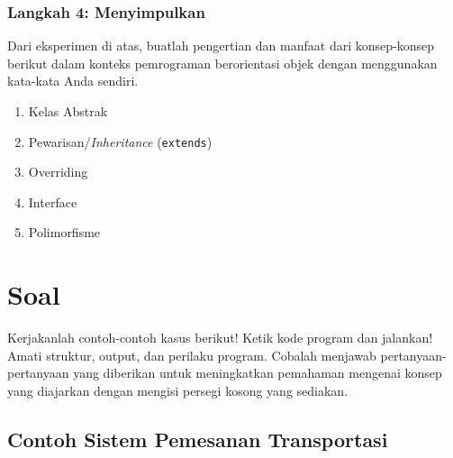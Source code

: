 \subsubsection{Langkah 4: Menyimpulkan}
Dari eksperimen di atas, buatlah pengertian dan manfaat dari konsep-konsep berikut dalam konteks pemrograman berorientasi objek dengan menggunakan kata-kata Anda sendiri.
\begin{enumerate}
	\item Kelas Abstrak
	\begin{tcolorbox}[colback=white, colframe=black,  width=\linewidth, height=3cm,  boxrule=1pt, sharp corners]
	\end{tcolorbox}
	\item Pewarisan/\textit{Inheritance} (\texttt{extends})
	\begin{tcolorbox}[colback=white, colframe=black,  width=\linewidth, height=3cm,  boxrule=1pt, sharp corners]
	\end{tcolorbox}
	\item Overriding
	\begin{tcolorbox}[colback=white, colframe=black,  width=\linewidth, height=3cm,  boxrule=1pt, sharp corners]
	\end{tcolorbox}
	\item Interface
	\begin{tcolorbox}[colback=white, colframe=black,  width=\linewidth, height=3cm,  boxrule=1pt, sharp corners]
	\end{tcolorbox}
	\item Polimorfisme
	\begin{tcolorbox}[colback=white, colframe=black,  width=\linewidth, height=3cm,  boxrule=1pt, sharp corners]
	\end{tcolorbox}
\end{enumerate}


\section{Soal}

Kerjakanlah contoh-contoh kasus berikut! Ketik kode program dan jalankan! Amati struktur, output, dan perilaku program. Cobalah menjawab pertanyaan-pertanyaan yang diberikan untuk meningkatkan pemahaman mengenai konsep yang diajarkan dengan mengisi persegi kosong yang sediakan.

\subsection{Contoh Sistem Pemesanan Transportasi}

